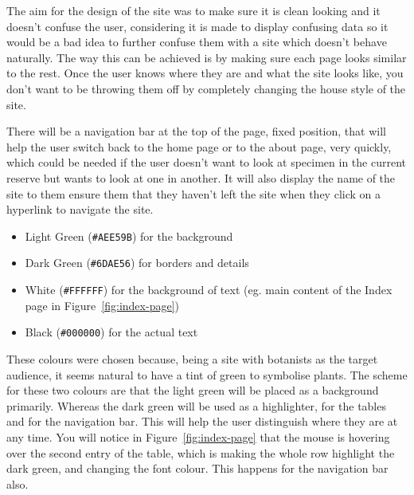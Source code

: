 \documentclass[12pt]{article}
\begin{document}
	  \noindent The aim for the design of the site was to make sure it is clean looking and it doesn’t confuse the user, considering it is made to display confusing data so it would be a bad idea to further confuse them with a site which doesn’t behave naturally. The way this can be achieved is by making sure each page looks similar to the rest. Once the user knows where they are and what the site looks like, you don’t want to be throwing them off by completely changing the house style of the site.

	  There will be a navigation bar at the top of the page, fixed position, that will help the user switch back to the home page or to the about page, very quickly, which could be needed if the user doesn’t want to look at specimen in the current reserve but wants to look at one in another. It will also display the name of the site to them ensure them that they haven’t left the site when they click on a hyperlink to navigate the site.

		\begin{itemize}
			\item Light Green (\textcolor{lgreen}{\texttt{\#AEE59B}}) for the background
			\item Dark Green (\textcolor{dgreen}{\texttt{\#6DAE56}}) for borders and details
			\item White (\texttt{\#FFFFFF}) for the background of text (eg. main content of the Index page in Figure~\ref{fig:index-page})
	  	\item Black (\texttt{\#000000}) for the actual text
		\end{itemize}

		\noindent These colours were chosen because, being a site with botanists as the target audience, it seems natural to have a tint of green to symbolise plants. The scheme for these two colours are that the light green will be placed as a background primarily. Whereas the dark green will be used as a highlighter, for the tables and for the navigation bar. This will help the user distinguish where they are at any time. You will notice in Figure~\ref{fig:index-page} that the mouse is hovering over the second entry of the table, which is making the whole row highlight the dark green, and changing the font colour. This happens for the navigation bar also.
\end{document}

